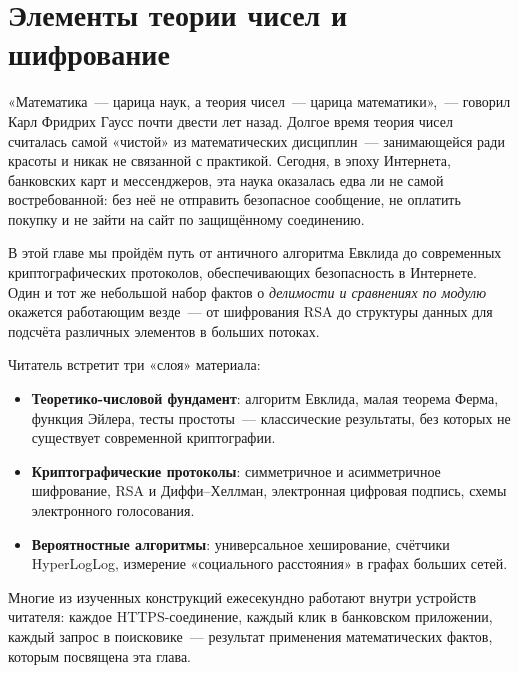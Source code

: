 \chapter{Элементы теории чисел и шифрование}
\label{ch:numtheory}

«Математика~--- царица наук, а теория чисел~--- царица математики»,~---
говорил Карл Фридрих Гаусс почти двести лет назад. Долгое время теория
чисел считалась самой «чистой» из математических дисциплин~--- занимающейся
ради красоты и никак не связанной с практикой. Сегодня, в эпоху Интернета,
банковских карт и мессенджеров, эта наука оказалась едва ли не самой
востребованной: без неё не отправить безопасное сообщение, не оплатить
покупку и не зайти на сайт по защищённому соединению.

В этой главе мы пройдём путь от античного алгоритма Евклида до современных
криптографических протоколов, обеспечивающих безопасность в Интернете.
Один и тот же небольшой набор фактов о \emph{делимости и сравнениях по
модулю} окажется работающим везде~--- от шифрования RSA до структуры
данных для подсчёта различных элементов в больших потоках.

Читатель встретит три «слоя» материала:
\begin{itemize}\itemsep1pt
  \item \textbf{Теоретико-числовой фундамент}: алгоритм Евклида,
        малая теорема Ферма, функция Эйлера, тесты простоты~---
        классические результаты, без которых не существует современной
        криптографии.
  \item \textbf{Криптографические протоколы}: симметричное и
        асимметричное шифрование, RSA и Диффи--Хеллман, электронная
        цифровая подпись, схемы электронного голосования.
  \item \textbf{Вероятностные алгоритмы}: универсальное хеширование,
        счётчики HyperLogLog, измерение «социального расстояния»
        в графах больших сетей.
\end{itemize}

Многие из изученных конструкций ежесекундно работают внутри устройств
читателя: каждое HTTPS-соединение, каждый клик в банковском приложении,
каждый запрос в поисковике~--- результат применения математических
фактов, которым посвящена эта глава.








